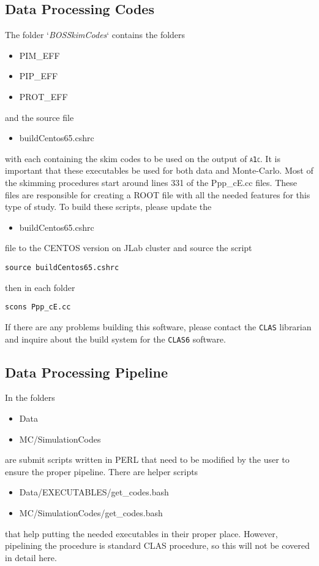 \documentclass[11pt,a4paper]{article}
\newcommand{\abbr}[1]{\textsc{\texttt{#1}}}
\begin{document}
\subsection{Data Processing Codes}
The folder `\emph{BOSSkimCodes}` contains the folders
\begin{itemize}
	\item PIM\_EFF
	\item PIP\_EFF
	\item PROT\_EFF
\end{itemize}
and the source file
\begin{itemize}
	\item buildCentos65.cshrc
\end{itemize}
with each containing the skim codes to be used on the output of \abbr{a1c}. It is important that these executables be used for both data and Monte-Carlo. Most of the skimming procedures start around lines 331 of the Ppp\_cE.cc files. These files are responsible for creating a ROOT file with all the needed features for this type of study.
To build these scripts, please update the 
\begin{itemize}
	\item buildCentos65.cshrc
\end{itemize}
file to the CENTOS version on JLab cluster and source the script
\begin{lstlisting}
source buildCentos65.cshrc
\end{lstlisting}
then in each folder  
\begin{lstlisting}
scons Ppp_cE.cc
\end{lstlisting}
If there are any problems building this software, please contact the \abbr{CLAS} librarian and inquire about the build system for the \abbr{CLAS6} software.
\subsection{Data Processing Pipeline}
In the folders 
\begin{itemize}
	\item Data
	\item MC/SimulationCodes
\end{itemize}
are submit scripts written in PERL that need to be modified by the user to ensure the proper pipeline. 
There are helper scripts
\begin{itemize}
	\item Data/EXECUTABLES/get\_codes.bash
	\item MC/SimulationCodes/get\_codes.bash
\end{itemize}
that help putting the needed executables in their proper place.
However, pipelining the procedure is standard CLAS procedure, so this will not be covered in detail here.
\end{document}
